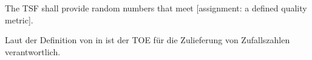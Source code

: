 \begin{sfrdefinitionlist}
\item[{\normalfont{\small\secitem{FCS_RNG.1.2}}}] The TSF shall provide random numbers that
  meet {[}assignment: a defined quality metric{]}.
\end{sfrdefinitionlist}


Laut der Definition von  in \citepp{} ist der TOE für die
Zulieferung von Zufallszahlen verantwortlich.

